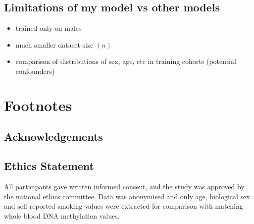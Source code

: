\documentclass{article}
\begin{document}
\subsection*{Limitations of my model vs other models}
\begin{itemize}
    \item trained only on males
    \item much smaller dataset size \((n)\)
    \item comparison of distributions of sex, age, etc in training cohorts (potential confounders)
\end{itemize}

\section{Footnotes}

\subsection{Acknowledgements}

\subsection{Ethics Statement}
All participants gave written informed consent, and the study was approved by the national ethics committee. Data was anonymised and only age, biological sex and self-reported smoking values were extracted for comparison with matching whole blood DNA methylation values.

\printbibliography
\end{document}

